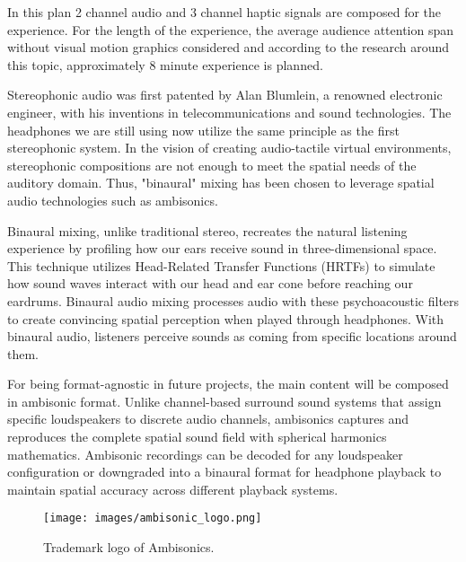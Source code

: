             In this plan 2 channel audio and 3 channel haptic signals are composed for the experience. For the length of the experience, the average audience attention span without visual motion graphics considered and according to the research around this topic\cite{UX_Interactive_Media}, approximately 8 minute experience is planned.\par

            Stereophonic audio was first patented by Alan Blumlein, a renowned electronic engineer, with his inventions in telecommunications and sound technologies\cite{Alan_Blumlein_and_the_Invention_of_Stereo}. The headphones we are still using now utilize the same principle as the first stereophonic system. In the vision of creating audio-tactile virtual environments, stereophonic compositions are not enough to meet the spatial needs of the auditory domain. Thus, "binaural" mixing has been chosen to leverage spatial audio technologies such as ambisonics.\par

            Binaural mixing, unlike traditional stereo, recreates the natural listening experience by profiling how our ears receive sound in three-dimensional space. This technique utilizes Head-Related Transfer Functions (HRTFs) to simulate how sound waves interact with our head and ear cone before reaching our eardrums. Binaural audio mixing processes audio with these psychoacoustic filters to create convincing spatial perception when played through headphones. With binaural audio, listeners perceive sounds as coming from specific locations around them\cite{3D_Audio_and_Acoustic_Environment_Modeling}\cite{3D_Audio}.\par

            For being format-agnostic in future projects, the main content will be composed in ambisonic format. Unlike channel-based surround sound systems that assign specific loudspeakers to discrete audio channels, ambisonics captures and reproduces the complete spatial sound field with spherical harmonics mathematics. Ambisonic recordings can be decoded for any loudspeaker configuration or downgraded into a binaural format for headphone playback to maintain spatial accuracy across different playback systems\cite{Ambisonics}.\par

            \begin{figure}[H]
                \centering
                \texttt{[image: images/ambisonic\_logo.png]}
                \caption{Trademark logo of Ambisonics.}
                \label{fig:AMBISONICS}
            \end{figure}

